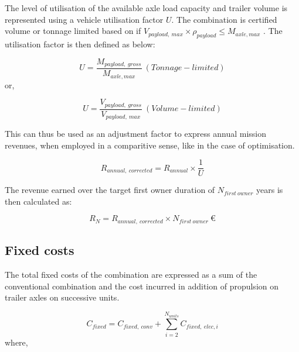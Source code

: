 \documentclass[ExampleMasters.tex]{subfiles}
\begin{document}
		The level of utilisation of the available axle load capacity and trailer volume is represented using a vehicle utilisation factor $U$. The combination is certified volume or tonnage limited based on if $V_{payload,\ max} \times \rho_{payload} \leq M_{axle, max}$    . The utilisation factor is then defined as below:

		\begin{equation}
			U = \frac{M_{payload,\ gross}}{M_{axle,max}}\ (Tonnage-limited)
		\end{equation}
		or,

		\begin{equation}
			U = \frac{V_{payload,\ gross}}{V_{payload,\ max}}\ (Volume-limited)
		\end{equation}

		This can thus be used as an adjustment factor to express annual mission revenues, when employed in a comparitive sense, like in the case of optimisation.

		\begin{equation}
			R_{annual,\ corrected} = R_{annual} \times \frac{1}{U}
		\end{equation}

		 The revenue earned over the target first owner duration of $N_{first\ owner}$ years is then calculated as:

		\begin{equation}
			R_{N} = R_{annual,\ corrected} \times N_{first\ owner} \  \euro
		\end{equation}

		\subsection{Fixed costs}

			The total fixed costs of the combination are expressed as a sum of the conventional combination and the cost incurred in addition of propulsion on trailer axles on successive units.

			\begin{equation}
				C_{fixed} = C_{fixed,\ conv}+ \displaystyle \sum_{i=2}^{N_{units}} C_{fixed,\ elec, i}
			\end{equation}
			   where, 
\end{document}
